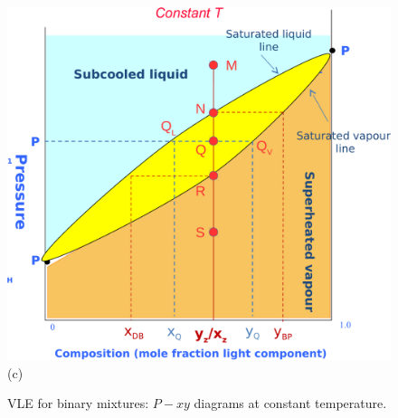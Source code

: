 \documentclass[12pts,a4paper,amsmath,amssymb,floatfix]{article}%
\begin{document}
\begin{figure}[h]
{          \vspace{-.5cm}\hbox{\hspace{3.cm}\includegraphics[width=.6\linewidth,clip]{./../Pics/VLE_Pxy_Diagram3b}}
          \vspace{-.1cm}
          \hbox{\hspace{7.5cm}(c)}}
             \vspace{-.1cm}\caption{VLE for binary mixtures: $P-xy$ diagrams at constant temperature.}\label{Mod04Fig03}
      \end{figure}
      
\end{document}
